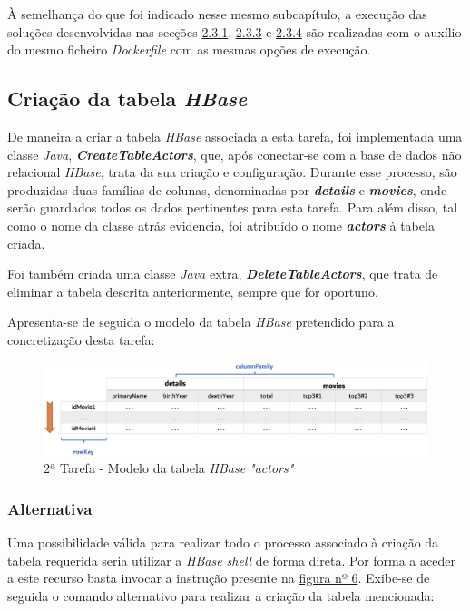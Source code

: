 \documentclass[a4paper]{report}
\begin{document}
{	À semelhança do que foi indicado nesse mesmo subcapítulo, a execução das soluções desenvolvidas nas secções \hyperref[subsec:Task2-1]{2.3.1}, \hyperref[subsec:Task2-3]{2.3.3} e \hyperref[subsec:Task2-4]{2.3.4} são realizadas com o auxílio do mesmo ficheiro \textit{Dockerfile} com as mesmas opções de execução.
		
		\subsection{Criação da tabela \textit{HBase}} \label{subsec:Task2-1}
		De maneira a criar a tabela \textit{HBase} associada a esta tarefa, foi implementada uma classe \textit{Java}, \textbf{\textit{CreateTableActors}}, que, após conectar-se com a base de dados não relacional \textit{HBase}, trata da sua criação e configuração.
		Durante esse processo, são produzidas duas famílias de colunas, denominadas por \textbf{\textit{details}} e \textbf{\textit{movies}}, onde serão guardados todos os dados pertinentes para esta tarefa. Para além disso, tal como o nome da classe atrás evidencia, foi atribuído o nome \textbf{\textit{actors}} à tabela criada.

		Foi também criada uma classe \textit{Java} extra, \textbf{\textit{DeleteTableActors}}, que trata de eliminar a tabela descrita anteriormente, sempre que for oportuno.
        
        Apresenta-se de seguida o modelo da tabela \textit{HBase} pretendido para a concretização desta tarefa:
        \begin{figure}[H]
            \centering
            \includegraphics[width=1.0\textwidth]{Imagens/2ª Tarefa - Tabela Hbase.png}
            \caption{2ª Tarefa - Modelo da tabela \textit{HBase "actors"}}
            \label{fig:13}
        \end{figure}

			\subsubsection{Alternativa}
			Uma possibilidade válida para realizar todo o processo associado à criação da tabela requerida seria utilizar a \textit{HBase shell} de forma direta. Por forma a aceder a este recurso basta invocar a instrução presente na \hyperref[fig:6]{figura nº 6}.
			Exibe-se de seguida o comando alternativo para realizar a criação da tabela mencionada:

}
\end{document}

